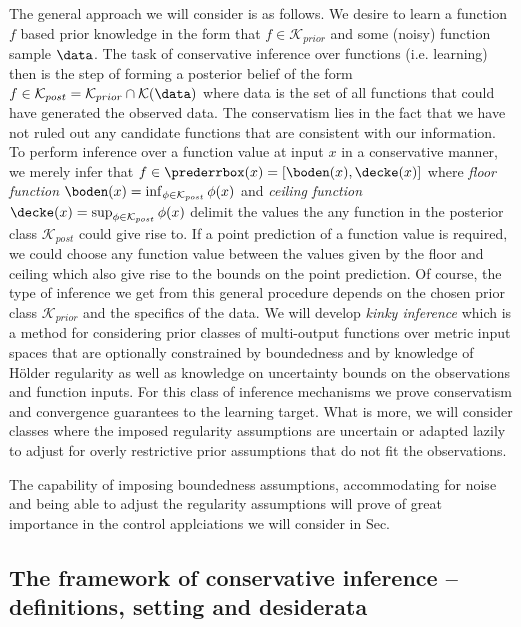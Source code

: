 The general approach we will consider is as follows. We desire to learn a function $f$ based prior knowledge in the form that $f \in \mathcal K_{prior}$ and some (noisy) function sample $\data$. 
The task of conservative inference over functions (i.e. learning) then is the step of forming a posterior belief of the form $f \in \mathcal K_{post}= \mathcal K_{prior} \cap \mathcal K(\data)$
where data is the set of all functions that could have generated the observed data. 
The conservatism lies in the fact that we have not ruled out any candidate functions that are consistent with our information. 
To perform inference over a function value at input $x$ in a conservative manner, we merely infer that $f \in \prederrbox(x) =[\boden(x), \decke(x)]$ 
where \textit{floor function} $\boden(x) =\inf_{\phi \in \mathcal K_{post}} \phi(x)$ and  \textit{ceiling function } $\decke(x) = \sup_{\phi \in \mathcal K_{post}} \phi(x)$ delimit the values the any function in the posterior class $\mathcal K_{post}$ could give rise to. If a point prediction of a function value is required, we could choose any function value between the values given by the floor and ceiling which also give rise to the bounds on the point prediction. 
Of course, the type of inference we get from this general procedure depends on the chosen prior class $\mathcal K_{prior}$ and the specifics of the data. We will develop \textit{kinky inference} which is a method for considering prior classes of multi-output functions over metric input spaces that are optionally constrained by boundedness and by knowledge of H\"older regularity as well as knowledge on uncertainty bounds on the observations and function inputs. For this class of inference mechanisms we prove conservatism and convergence guarantees to the learning target. What is more, we will consider classes where the imposed regularity assumptions are uncertain or adapted lazily to adjust for overly restrictive prior assumptions that do not fit the observations.

The capability of imposing boundedness assumptions, accommodating for noise and being able to adjust the regularity assumptions will prove of great importance in the 
control applciations we will consider in Sec.  
\subsection{The framework of conservative inference -- definitions, setting and desiderata }
\label{sec:prob_def}



